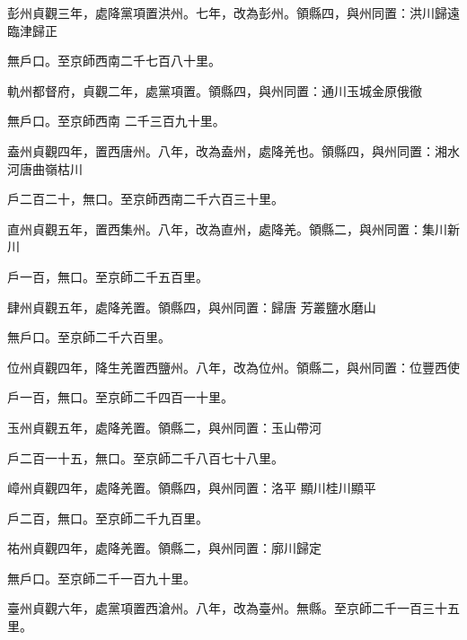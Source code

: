 \begin{pinyinscope}
 彭州貞觀三年，處降黨項置洪州。七年，改為彭州。領縣四，與州同置：洪川歸遠臨津歸正



 無戶口。至京師西南二千七百八十里。



 軌州都督府，貞觀二年，處黨項置。領縣四，與州同置：通川玉城金原俄徹



 無戶口。至京師西南
 二千三百九十里。



 盍州貞觀四年，置西唐州。八年，改為盍州，處降羌也。領縣四，與州同置：湘水河唐曲嶺枯川



 戶二百二十，無口。至京師西南二千六百三十里。



 直州貞觀五年，置西集州。八年，改為直州，處降羌。領縣二，與州同置：集川新川



 戶一百，無口。至京師二千五百里。



 肆州貞觀五年，處降羌置。領縣四，與州同置：歸唐
 芳叢鹽水磨山



 無戶口。至京師二千六百里。



 位州貞觀四年，降生羌置西鹽州。八年，改為位州。領縣二，與州同置：位豐西使



 戶一百，無口。至京師二千四百一十里。



 玉州貞觀五年，處降羌置。領縣二，與州同置：玉山帶河



 戶二百一十五，無口。至京師二千八百七十八里。



 嶂州貞觀四年，處降羌置。領縣四，與州同置：洛平
 顯川桂川顯平



 戶二百，無口。至京師二千九百里。



 祐州貞觀四年，處降羌置。領縣二，與州同置：廓川歸定



 無戶口。至京師二千一百九十里。



 臺州貞觀六年，處黨項置西滄州。八年，改為臺州。無縣。至京師二千一百三十五里。




\end{pinyinscope}
